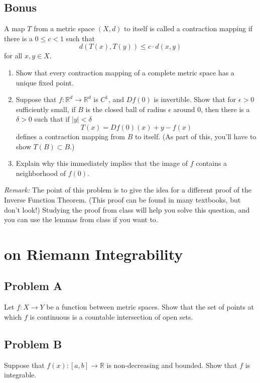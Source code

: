 \documentclass[lang=cn,11pt]{template}
\begin{document}
\section*{Bonus}
A map \( T \) from a metric space \( (X, d) \) to itself is called a contraction mapping if there is a \( 0 \leq c < 1 \) such that
\[
d(T(x), T(y)) \leq c \cdot d(x, y)
\]
for all \( x, y \in X \).

\begin{enumerate}
    \item Show that every contraction mapping of a complete metric space has a unique fixed point.
    \item Suppose that \( f : \mathbb{R}^d \to \mathbb{R}^d \) is \( C^1 \), and \( Df(0) \) is invertible. Show that for \( \epsilon > 0 \) sufficiently small, if \( B \) is the closed ball of radius \( \epsilon \) around 0, then there is a \( \delta > 0 \) such that if \( |y| < \delta \)
    \[
    T(x) = Df(0)(x) + y - f(x)
    \]
    defines a contraction mapping from \( B \) to itself. (As part of this, you’ll have to show \( T(B) \subset B \).)
    \item Explain why this immediately implies that the image of \( f \) contains a neighborhood of \( f(0) \).
\end{enumerate}

\textit{Remark:} The point of this problem is to give the idea for a different proof of the Inverse Function Theorem. (This proof can be found in many textbooks, but don’t look!) Studying the proof from class will help you solve this question, and you can use the lemmas from class if you want to.






\chapter{on Riemann Integrability}

\section*{Problem A}
Let $f : X \to Y$ be a function between metric spaces. Show that the set of points at which $f$ is continuous is a countable intersection of open sets.

\section*{Problem B}
Suppose that $f(x) : [a, b] \to \mathbb{R}$ is non-decreasing and bounded. Show that $f$ is integrable.
\end{document}
